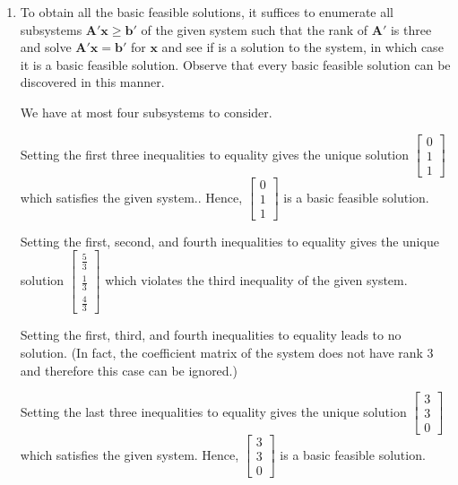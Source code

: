 \documentclass[]{book}
\newcommand{\mm}[1]{\mathbf{#1}}
\renewcommand{\vec}[1]{\mathbf{#1}}
\theoremstyle{definition}
\theoremstyle{definition}
\theoremstyle{remark}
\begin{document}
\begin{enumerate}
\def\labelenumi{\arabic{enumi}.}
\item
  To obtain all the basic feasible solutions, it suffices to enumerate
  all subsystems \(\mm{A}' \vec{x} \geq \vec{b}'\) of the given system
  such that the rank of \(\mm{A}'\) is three and solve
  \(\mm{A}' \vec{x} = \vec{b}'\) for \(\vec{x}\) and see if is a
  solution to the system, in which case it is a basic feasible solution.
  Observe that every basic feasible solution can be discovered in this
  manner.

  We have at most four subsystems to consider.

  Setting the first three inequalities to equality gives the unique
  solution \(\begin{bmatrix} 0 \\ 1 \\ 1 \end{bmatrix}\) which satisfies
  the given system.. Hence,
  \(\begin{bmatrix} 0 \\ 1 \\ 1 \end{bmatrix}\) is a basic feasible
  solution.

  Setting the first, second, and fourth inequalities to equality gives
  the unique solution
  \(\begin{bmatrix} \frac{5}{3} \\ \frac{1}{3} \\ \frac{4}{3} \end{bmatrix}\)
  which violates the third inequality of the given system.

  Setting the first, third, and fourth inequalities to equality leads to
  no solution. (In fact, the coefficient matrix of the system does not
  have rank 3 and therefore this case can be ignored.)

  Setting the last three inequalities to equality gives the unique
  solution \(\begin{bmatrix} 3 \\ 3 \\ 0 \end{bmatrix}\) which satisfies
  the given system. Hence, \(\begin{bmatrix} 3 \\ 3 \\ 0 \end{bmatrix}\)
  is a basic feasible solution.


\end{enumerate}
\end{document}
